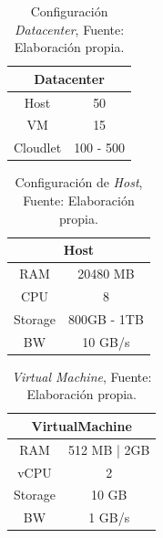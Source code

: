 \setcounter{table}{0}
\renewcommand\thetable{\arabic{table}}
\begin{table}[h!]
	\centering
	\begin{tabular}{@{}cc@{}}
		\toprule
		\multicolumn{2}{c}{{\bf Datacenter}} \\ \midrule
		Host              & 50               \\
		VM                & 15                \\
		Cloudlet          & 100 - 500          \\ \bottomrule
		
	\end{tabular}
	\caption{Configuraci\'on \textit{Datacenter}, Fuente: Elaboraci\'on propia.}
	\label{table:datacenter}
\end{table}
 
\setcounter{table}{1}
\renewcommand\thetable{\arabic{table}}
\begin{table}[h!]
	\centering
	\begin{tabular}{@{}cc@{}}
		\toprule
		\multicolumn{2}{c}{{\bf Host}} \\ \midrule
		RAM           & 20480 MB        \\
		CPU           & 8              \\
		Storage       & 800GB - 1TB      \\ 
		BW            & 10 GB/s        
		\\ \bottomrule
	\end{tabular}
	\caption{Configuraci\'on de \textit{Host}, Fuente: Elaboraci\'on propia.}
	\label{tab:host}
\end{table}

\newpage

\setcounter{table}{2}
\renewcommand\thetable{\arabic{table}}
\begin{table}[h!]
	\centering
	\begin{tabular}{@{}cc@{}}
		\toprule
		\multicolumn{2}{c}{{\bf VirtualMachine}} \\ \midrule
		RAM               & 512 MB | 2GB          \\
		vCPU              & 2           \\
		Storage           & 10 GB                \\ 
		BW                & 1 GB/s    
		\\ \bottomrule          
	\end{tabular}
	\caption{\textit{Virtual Machine}, Fuente: Elaboraci\'on propia.}
	\label{tab:machine}
\end{table}



